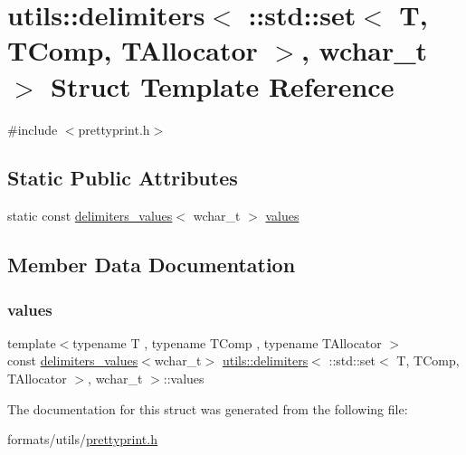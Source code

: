 \hypertarget{structutils_1_1delimiters_3_01_1_1std_1_1set_3_01_t_00_01_t_comp_00_01_t_allocator_01_4_00_01wchar__t_01_4}{}\section{utils\+::delimiters$<$ \+::std\+::set$<$ T, T\+Comp, T\+Allocator $>$, wchar\+\_\+t $>$ Struct Template Reference}
\label{structutils_1_1delimiters_3_01_1_1std_1_1set_3_01_t_00_01_t_comp_00_01_t_allocator_01_4_00_01wchar__t_01_4}


{\ttfamily \#include $<$prettyprint.\+h$>$}

\subsection*{Static Public Attributes}
\begin{DoxyCompactItemize}
\item 
static const \mbox{\hyperlink{structutils_1_1delimiters__values}{delimiters\+\_\+values}}$<$ wchar\+\_\+t $>$ \mbox{\hyperlink{structutils_1_1delimiters_3_01_1_1std_1_1set_3_01_t_00_01_t_comp_00_01_t_allocator_01_4_00_01wchar__t_01_4_a182330ad065bc4738d1010b37e16c6db}{values}}
\end{DoxyCompactItemize}


\subsection{Member Data Documentation}
\mbox{\label{structutils_1_1delimiters_3_01_1_1std_1_1set_3_01_t_00_01_t_comp_00_01_t_allocator_01_4_00_01wchar__t_01_4_a182330ad065bc4738d1010b37e16c6db}} 
\subsubsection{\texorpdfstring{values}{values}}
{\footnotesize\ttfamily template$<$typename T , typename T\+Comp , typename T\+Allocator $>$ \\
const \mbox{\hyperlink{structutils_1_1delimiters__values}{delimiters\+\_\+values}}$<$wchar\+\_\+t$>$ \mbox{\hyperlink{structutils_1_1delimiters}{utils\+::delimiters}}$<$ \+::std\+::set$<$ T, T\+Comp, T\+Allocator $>$, wchar\+\_\+t $>$\+::values\hspace{0.3cm}{\ttfamily [static]}}



The documentation for this struct was generated from the following file\+:\begin{DoxyCompactItemize}
\item 
formats/utils/\mbox{\hyperlink{prettyprint_8h}{prettyprint.\+h}}\end{DoxyCompactItemize}
